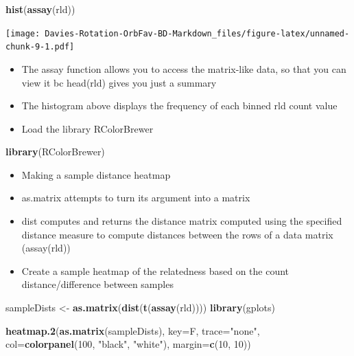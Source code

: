 \documentclass[
]{article}
\newenvironment{Shaded}{\begin{snugshade}}{\end{snugshade}}
\newcommand{\DataTypeTok}[1]{\textcolor[rgb]{0.13,0.29,0.53}{#1}}
\newcommand{\DecValTok}[1]{\textcolor[rgb]{0.00,0.00,0.81}{#1}}
\newcommand{\KeywordTok}[1]{\textcolor[rgb]{0.13,0.29,0.53}{\textbf{#1}}}
\newcommand{\NormalTok}[1]{#1}
\newcommand{\StringTok}[1]{\textcolor[rgb]{0.31,0.60,0.02}{#1}}
\providecommand{\tightlist}{%
  \setlength{\itemsep}{0pt}\setlength{\parskip}{0pt}}
\begin{document}
\begin{Shaded}
\begin{Highlighting}[]
\KeywordTok{hist}\NormalTok{(}\KeywordTok{assay}\NormalTok{(rld))}
\end{Highlighting}
\end{Shaded}

\texttt{[image: Davies-Rotation-OrbFav-BD-Markdown\_files/figure-latex/unnamed-chunk-9-1.pdf]}

\begin{itemize}
\item
  The assay function allows you to access the matrix-like data, so that
  you can view it bc head(rld) gives you just a summary
\item
  The histogram above displays the frequency of each binned rld count
  value
\item
  Load the library RColorBrewer
\end{itemize}

\begin{Shaded}
\begin{Highlighting}[]
\KeywordTok{library}\NormalTok{(RColorBrewer)}
\end{Highlighting}
\end{Shaded}

\begin{itemize}
\tightlist
\item
  Making a sample distance heatmap
\item
  as.matrix attempts to turn its argument into a matrix
\item
  dist computes and returns the distance matrix computed using the
  specified distance measure to compute distances between the rows of a
  data matrix (assay(rld))
\item
  Create a sample heatmap of the relatedness based on the count
  distance/difference between samples
\end{itemize}

\begin{Shaded}
\begin{Highlighting}[]
\NormalTok{sampleDists <-}\StringTok{ }\KeywordTok{as.matrix}\NormalTok{(}\KeywordTok{dist}\NormalTok{(}\KeywordTok{t}\NormalTok{(}\KeywordTok{assay}\NormalTok{(rld))))}
\KeywordTok{library}\NormalTok{(gplots)}
\end{Highlighting}
\end{Shaded}

\begin{Shaded}
\begin{Highlighting}[]
\KeywordTok{heatmap.2}\NormalTok{(}\KeywordTok{as.matrix}\NormalTok{(sampleDists), }\DataTypeTok{key=}\NormalTok{F, }\DataTypeTok{trace=}\StringTok{"none"}\NormalTok{,}
          \DataTypeTok{col=}\KeywordTok{colorpanel}\NormalTok{(}\DecValTok{100}\NormalTok{, }\StringTok{"black"}\NormalTok{, }\StringTok{"white"}\NormalTok{),}
          \DataTypeTok{margin=}\KeywordTok{c}\NormalTok{(}\DecValTok{10}\NormalTok{, }\DecValTok{10}\NormalTok{))}
\end{Highlighting}
\end{Shaded}
\end{document}
